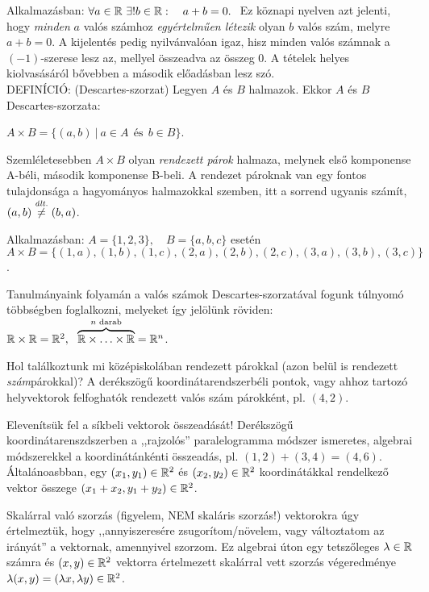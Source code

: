 \documentclass[a4paper,11.5pt]{article}
\begin{document}
	Alkalmazásban: $\forall a \in \mathbb{R}~\exists!b \in \mathbb{R}: \quad a+b=0.~$ Ez köznapi nyelven azt jelenti, hogy \emph{minden} $a$ valós számhoz \emph{egyértelműen létezik} olyan $b$ valós szám, melyre $a+b=0$. A kijelentés pedig nyilvánvalóan igaz, hisz minden valós számnak a $(-1)$-szerese lesz az, mellyel összeadva az összeg 0. A tételek helyes kiolvasásáról bővebben a második előadásban lesz szó.\\
	DEFINÍCIÓ: (Descartes-szorzat) Legyen $A$ és $B$ halmazok. Ekkor $A$ és $B$ Descartes-szorzata:
	\begin{center}
		$A \times B=\{(a,b)~|~a\in A~~\text{és}~~b\in B\}$.
	\end{center}
	\noindent Szemléletesebben $A\times B$ olyan \emph{rendezett párok} halmaza, melynek első komponense A-béli, második komponense B-beli. A rendezet pároknak van egy fontos tulajdonsága a hagyományos halmazokkal szemben, itt a sorrend ugyanis számít, $(a,b) \overset{\text{\textit{ált.}}}{\not=} (b,a)$.
	
	\noindent Alkalmazásban: $A=\{1, 2, 3\}, \quad B=\{a, b, c\}$ esetén\\
	$A\times B=\{(1, a), (1, b), (1, c), (2, a), (2, b), (2, c), (3, a), (3, b), (3, c)\}$.
	
	\bigskip
	Tanulmányaink folyamán a valós számok Descartes-szorzatával fogunk túlnyomó többségben foglalkozni, melyeket így jelölünk röviden: $\mathbb{R} \times\mathbb{R}=\mathbb{R}^2,~~\overbrace{\mathbb{R}\times\ldots\times\mathbb{R}}^{n \text{ darab}}=\mathbb{R}^{n}$.
	
	Hol találkoztunk mi középiskolában rendezett párokkal (azon belül is rendezett \emph{szám}pá\-rok\-kal)? A derékszögű koordinátarendszerbéli pontok, vagy ahhoz tartozó helyvektorok felfoghatók rendezett valós szám párokként, pl. $(4, 2)$. 
	
	Elevenítsük fel a síkbeli vektorok összeadását! Derékszögű koordinátarenszdszerben a ,,rajzolós'' paralelogramma módszer ismeretes, algebrai módszerekkel a koordinátánkénti  összeadás, pl. $(1, 2) + (3, 4) =(4, 6)$. Általánoasbban, egy $(x_1, y_1) \in \mathbb{R}^2$ és $(x_2, y_2) \in \mathbb{R}^2$ koordinátákkal rendelkező vektor összege $(x_1+x_2, y_1+y_2) \in \mathbb{R}^2$.
	
	Skalárral való szorzás (figyelem, NEM skaláris szorzás!) vektorokra úgy értelmeztük, hogy ,,annyiszeresére zsugorítom/növelem, vagy változtatom az irányát'' a vektornak, amennyivel szorzom. Ez algebrai úton egy tetszőleges $\lambda \in \mathbb{R}$ számra és $(x,y)\in\mathbb{R}^2$ vektorra értelmezett skalárral vett szorzás végeredménye $\lambda(x, y)= (\lambda x, \lambda y) \in \mathbb{R}^2$.
	
\end{document}

